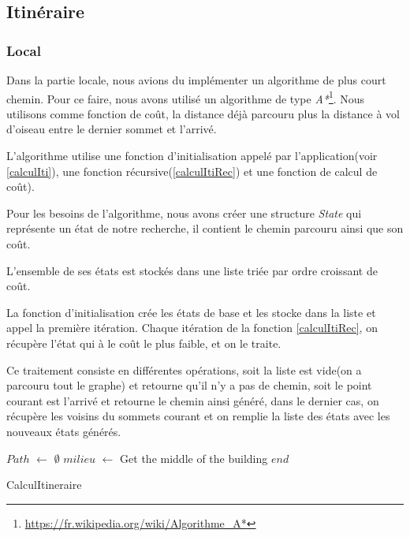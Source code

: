 \subsection{Itinéraire}
\subsubsection{Local}
Dans la partie locale, nous avions du implémenter un algorithme de plus court chemin. Pour ce faire, nous avons utilisé un algorithme de type \emph{A*}\footnote{\url{https://fr.wikipedia.org/wiki/Algorithme_A*}}. Nous utilisons comme fonction de co\^{u}t, la distance déjà parcouru plus la distance à vol d'oiseau entre le dernier sommet et l'arrivé.

L'algorithme utilise une fonction d'initialisation appelé par l'application(voir \ref{calculIti}), une fonction récursive(\ref{calculItiRec}) et une fonction de calcul de co\^{u}t).

Pour les besoins de l'algorithme, nous avons créer une structure \emph{State} qui représente un état de notre recherche, il contient le chemin parcouru ainsi que son co\^{u}t.

L'ensemble de ses états est stockés dans une liste triée par ordre croissant de co\^{u}t.

La fonction d'initialisation crée les états de base et les stocke dans la liste et appel la première itération. Chaque itération de la fonction \ref{calculItiRec}, on récupère l'état qui à le co\^{u}t le plus faible, et on le traite.

Ce traitement consiste en différentes opérations, soit la liste est vide(on a parcouru tout le graphe) et retourne qu'il n'y a pas de chemin, soit le point courant est l'arrivé et retourne le chemin ainsi généré, dans le dernier cas, on récupère les voisins du sommets courant et on remplie la liste des états avec les nouveaux états générés.

\newpage

\begin{algorithm}[H]
 $Path$ $\gets$ $\emptyset$\;
 $milieu$ $\gets$ Get the middle of the building $end$\;
 
 \caption{CalculItineraire\label{calculIti}}
\end{algorithm}

